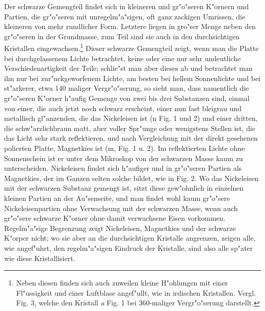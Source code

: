 \documentclass[a4paper, 11pt, oneside]{article}
\begin{document}
Der schwarze Gemengteil findet sich in kleineren und gr"o"seren K"ornern und Partien, die gr"o"seren mit unregelm"a"sigen, oft ganz zackigen Umrissen, die kleineren von mehr rundlicher Form. Letztere liegen in gro"ser Menge neben den gr"o"seren in der Grundmasse, zum Teil sind sie auch in den durchsichtigen Kristallen eingewachsen.\footnote{Neben diesen finden sich auch zuweilen kleine H"ohlungen mit einer Fl"ussigkeit und einer Luftblase angef"ullt, wie in irdischen Kristallen. Vergl. Fig. 3, welche den Kristall \emph{a} Fig. 1 bei 360-maliger Vergr"o"serung darstellt.} Dieser schwarze Gemengteil zeigt, wenn man die Platte bei durchgelassenem Lichte betrachtet, keine oder eine nur sehr undeutliche Verschiedenartigkeit der Teile; schlie"st man aber dieses ab und betrachtet man ihn nur bei zur"uckgeworfenem Lichte, am besten bei hellem Sonnenlichte und bei st"arkerer, etwa 140 maliger Vergr"o"serung, so sieht man, dass namentlich die gr"o"seren K"orner h"aufig Gemenge von zwei bis drei Substanzen sind, einmal von einer, die auch jetzt noch schwarz erscheint, einer nun fast bleigrau und metallisch gl"anzenden, die das Nickeleisen ist (n Fig. 1 und 2) und einer dritten, die schw"arzlichbraun matt, aber voller Spr"unge oder wenigstens Stellen ist, die das Licht sehr stark reflektieren, und nach Vergleichung mit der direkt gesehenen polierten Platte, Magnetkies ist (m, Fig. 1 u. 2). Im reflektierten Lichte ohne Sonnenschein ist er unter dem Mikroskop von der schwarzen Masse kaum zu unterscheiden. Nickeleisen findet sich h"aufiger und in gr"o"seren Partien als Magnetkies, der im Ganzen selten solche bildet, wie in Fig. 2. Wo das Nickeleisen mit der schwarzen Substanz gemengt ist, sitzt diese gew"ohnlich in einzelnen kleinen Partien an der Au"senseite, und man findet wohl kaum gr"o"sere Nickeleisenpartien ohne Verwachsung mit der schwarzen Masse, wenn auch gr"o"sere schwarze K"orner ohne damit verwachsene Eisen vorkommen. Regelm"a"sige Begrenzung zeigt Nickeleisen, Magnetkies und der schwarze K"orper nicht; wo sie aber an die durchsichtigen Kristalle angrenzen, zeigen alle, wie angef"uhrt, den regelm"a"sigen Eindruck der Kristalle, sind also alle sp"ater wie diese Kristallisiert.
\end{document}
